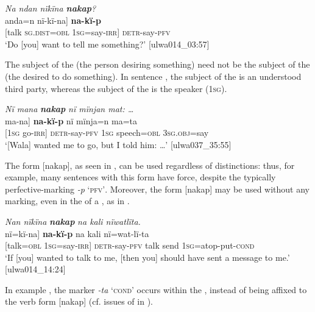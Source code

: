 \ea%
    \label{ex:syntax:382}
          \textit{Na ndan nïkïna \textbf{nakap}?}\\
\gll {[na}    anda=n    {nï-kï-na]}    \textbf{na-kï-p}\\
    {[talk}  \textsc{sg.dist=obl}  1\textsc{sg}=say-\textsc{irr]}  \textsc{detr-}say-\textsc{pfv}\\
\glt `Do [you] want to tell me something?’ [ulwa014\_03:57]
\z

The subject of the  (the person desiring something) need not be the subject of the  (the  desired to do something). In sentence , the subject of the  is an understood third party, whereas the subject of the  is the speaker (1\textsc{sg)}.

\ea%
    \label{ex:syntax:383}
          \textit{Nï mana} \textbf{\textit{nakap}} \textit{nï mïnjan mat: …}\\
\gll    {[nï}    {ma-na]}    \textbf{na-kï-p}    nï    mïnja=n    ma=ta\\
    {[1\textsc{sg}}  go-\textsc{irr]}  \textsc{detr-}say-\textsc{pfv}  \textsc{1sg}  speech=\textsc{obl}  3\textsc{sg.obj}=say\\
\glt `[Wala] wanted me to go, but I told him: …’ [ulwa037\_35:55]
\z

The form [nakap], as seen in , can be used regardless of  distinctions: thus, for example, many sentences with this form have  force, despite the typically perfective-marking  \textit{-p} \textsc{‘pfv’}. Moreover, the form [nakap] may be used without any  marking, even in the  of a , as in .

\ea%
    \label{ex:syntax:384}
          \textit{Nan nïkïna} \textbf{\textit{nakap}} \textit{na kali nïwatlïta.}\\
\gll    {[na=n}    {nï=kï-na]}    \textbf{na-kï-p}    na    kali     nï=wat-lï-ta\\
    {[talk=\textsc{obl}}  \textsc{1sg=}say-\textsc{irr]}  \textsc{detr-}say-\textsc{pfv}  talk  send    1\textsc{sg}=atop-put-\textsc{cond}\\
\glt `If [you] wanted to talk to me, [then you] should have sent a message to me.’ [ulwa014\_14:24]
\z

In example , the  marker \textit{-ta} \textsc{‘cond’} occurs within the , instead of being affixed to the  verb form [nakap] (cf. issues of  in ).

